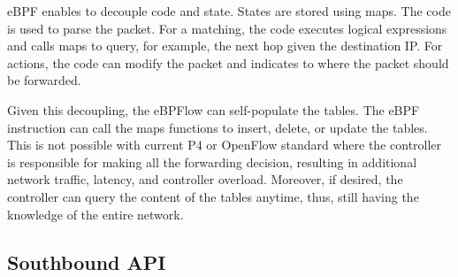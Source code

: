 eBPF enables to decouple code and state.
States are stored using maps.
The code is used to parse the packet.
For a matching, the code executes logical expressions and calls maps to query, for example, the next hop given the destination IP.
For actions, the code can modify the packet and indicates to where the packet should be forwarded.

Given this decoupling, the eBPFlow can self-populate the tables. The eBPF instruction can call the maps functions to insert, delete, or update the tables. This is not possible with current P4 or OpenFlow standard where
the controller is responsible for making
all the forwarding decision, resulting in additional 
network traffic, latency, and controller overload.
Moreover, if desired, the controller can query the content of the tables anytime, 
 thus, still having the knowledge of the entire network.


\subsection{Southbound API}
\label{sec:southboundAPI}


